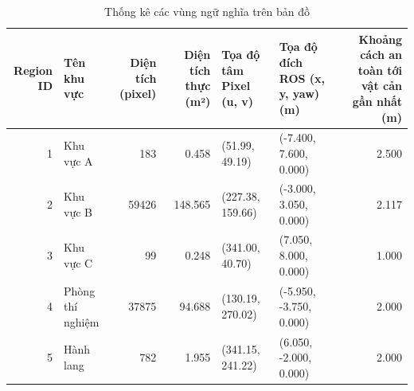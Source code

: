 \begin{table}[htbp]
\centering
\caption{Thống kê các vùng ngữ nghĩa trên bản đồ}
\label{tab:region-statistics}
\begin{tabular}{r l r r l l r}
\hline
Region ID & Tên khu vực & Diện tích (pixel) & Diện tích thực (m²) & Tọa độ tâm Pixel (u, v) & Tọa độ đích ROS (x, y, yaw) (m) & Khoảng cách an toàn tới vật cản gần nhất (m) \\
\hline
1 & Khu vực A & 183 & 0.458 & (51.99, 49.19) & (-7.400, 7.600, 0.000) & 2.500 \\
2 & Khu vực B & 59426 & 148.565 & (227.38, 159.66) & (-3.000, 3.050, 0.000) & 2.117 \\
3 & Khu vực C & 99 & 0.248 & (341.00, 40.70) & (7.050, 8.000, 0.000) & 1.000 \\
4 & Phòng thí nghiệm & 37875 & 94.688 & (130.19, 270.02) & (-5.950, -3.750, 0.000) & 2.000 \\
5 & Hành lang & 782 & 1.955 & (341.15, 241.22) & (6.050, -2.000, 0.000) & 2.000 \\
\hline
\end{tabular}
\end{table}
